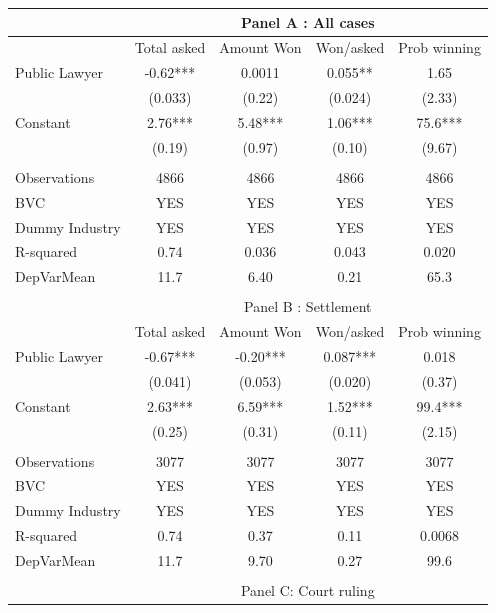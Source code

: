 \begin{tabular}{lcccc}
\toprule
      & \multicolumn{4}{c}{Panel A : All cases} \\
\midrule
\midrule
      & Total asked & Amount Won & Won/asked & Prob winning \\
\midrule
\midrule
Public Lawyer & -0.62*** & 0.0011 & 0.055** & 1.65 \\
      & (0.033) & (0.22) & (0.024) & (2.33) \\
Constant & 2.76*** & 5.48*** & 1.06*** & 75.6*** \\
      & (0.19) & (0.97) & (0.10) & (9.67) \\
      &       &       &       &  \\
\midrule
Observations & 4866  & 4866  & 4866  & 4866 \\
BVC   & YES   & YES   & YES   & YES \\
Dummy Industry & YES   & YES   & YES   & YES \\
R-squared & 0.74  & 0.036 & 0.043 & 0.020 \\
DepVarMean & 11.7  & 6.40  & 0.21  & 65.3 \\
\midrule
\midrule
      &       &       &       &  \\
\midrule
      & \multicolumn{4}{c}{Panel B : Settlement} \\
\midrule
\midrule
      & Total asked & Amount Won & Won/asked & Prob winning \\
\midrule
\midrule
Public Lawyer & -0.67*** & -0.20*** & 0.087*** & 0.018 \\
      & (0.041) & (0.053) & (0.020) & (0.37) \\
Constant & 2.63*** & 6.59*** & 1.52*** & 99.4*** \\
      & (0.25) & (0.31) & (0.11) & (2.15) \\
      &       &       &       &  \\
\midrule
Observations & 3077  & 3077  & 3077  & 3077 \\
BVC   & YES   & YES   & YES   & YES \\
Dummy Industry & YES   & YES   & YES   & YES \\
R-squared & 0.74  & 0.37  & 0.11  & 0.0068 \\
DepVarMean & 11.7  & 9.70  & 0.27  & 99.6 \\
\midrule
\midrule
      &       &       &       &  \\
\midrule
      & \multicolumn{4}{c}{Panel C: Court ruling} \\

\end{tabular}
